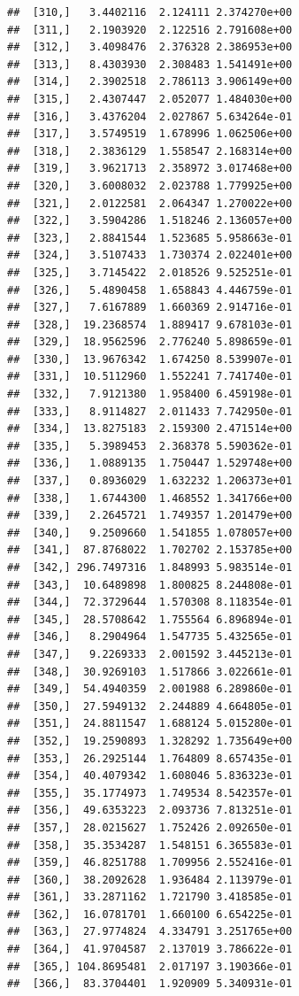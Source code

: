 \documentclass[article]{jss}\usepackage[]{graphicx}\usepackage[]{xcolor}
\makeatletter
\newenvironment{kframe}{%
 \def\at@end@of@kframe{}%
 \ifinner\ifhmode%
  \def\at@end@of@kframe{\end{minipage}}%
  \begin{minipage}{\columnwidth}%
 \fi\fi%
 \def\FrameCommand##1{\hskip\@totalleftmargin \hskip-\fboxsep
 \colorbox{shadecolor}{##1}\hskip-\fboxsep
     \hskip-\linewidth \hskip-\@totalleftmargin \hskip\columnwidth}%
 \MakeFramed {\advance\hsize-\width
   \@totalleftmargin\z@ \linewidth\hsize
   \@setminipage}}%
 {\par\unskip\endMakeFramed%
 \at@end@of@kframe}
\newenvironment{knitrout}{}{} %
\makeatother
\begin{document}
\begin{knitrout}
\begin{kframe}
\begin{verbatim}
##  [310,]   3.4402116  2.124111 2.374270e+00
##  [311,]   2.1903920  2.122516 2.791608e+00
##  [312,]   3.4098476  2.376328 2.386953e+00
##  [313,]   8.4303930  2.308483 1.541491e+00
##  [314,]   2.3902518  2.786113 3.906149e+00
##  [315,]   2.4307447  2.052077 1.484030e+00
##  [316,]   3.4376204  2.027867 5.634264e-01
##  [317,]   3.5749519  1.678996 1.062506e+00
##  [318,]   2.3836129  1.558547 2.168314e+00
##  [319,]   3.9621713  2.358972 3.017468e+00
##  [320,]   3.6008032  2.023788 1.779925e+00
##  [321,]   2.0122581  2.064347 1.270022e+00
##  [322,]   3.5904286  1.518246 2.136057e+00
##  [323,]   2.8841544  1.523685 5.958663e-01
##  [324,]   3.5107433  1.730374 2.022401e+00
##  [325,]   3.7145422  2.018526 9.525251e-01
##  [326,]   5.4890458  1.658843 4.446759e-01
##  [327,]   7.6167889  1.660369 2.914716e-01
##  [328,]  19.2368574  1.889417 9.678103e-01
##  [329,]  18.9562596  2.776240 5.898659e-01
##  [330,]  13.9676342  1.674250 8.539907e-01
##  [331,]  10.5112960  1.552241 7.741740e-01
##  [332,]   7.9121380  1.958400 6.459198e-01
##  [333,]   8.9114827  2.011433 7.742950e-01
##  [334,]  13.8275183  2.159300 2.471514e+00
##  [335,]   5.3989453  2.368378 5.590362e-01
##  [336,]   1.0889135  1.750447 1.529748e+00
##  [337,]   0.8936029  1.632232 1.206373e+01
##  [338,]   1.6744300  1.468552 1.341766e+00
##  [339,]   2.2645721  1.749357 1.201479e+00
##  [340,]   9.2509660  1.541855 1.078057e+00
##  [341,]  87.8768022  1.702702 2.153785e+00
##  [342,] 296.7497316  1.848993 5.983514e-01
##  [343,]  10.6489898  1.800825 8.244808e-01
##  [344,]  72.3729644  1.570308 8.118354e-01
##  [345,]  28.5708642  1.755564 6.896894e-01
##  [346,]   8.2904964  1.547735 5.432565e-01
##  [347,]   9.2269333  2.001592 3.445213e-01
##  [348,]  30.9269103  1.517866 3.022661e-01
##  [349,]  54.4940359  2.001988 6.289860e-01
##  [350,]  27.5949132  2.244889 4.664805e-01
##  [351,]  24.8811547  1.688124 5.015280e-01
##  [352,]  19.2590893  1.328292 1.735649e+00
##  [353,]  26.2925144  1.764809 8.657435e-01
##  [354,]  40.4079342  1.608046 5.836323e-01
##  [355,]  35.1774973  1.749534 8.542357e-01
##  [356,]  49.6353223  2.093736 7.813251e-01
##  [357,]  28.0215627  1.752426 2.092650e-01
##  [358,]  35.3534287  1.548151 6.365583e-01
##  [359,]  46.8251788  1.709956 2.552416e-01
##  [360,]  38.2092628  1.936484 2.113979e-01
##  [361,]  33.2871162  1.721790 3.418585e-01
##  [362,]  16.0781701  1.660100 6.654225e-01
##  [363,]  27.9774824  4.334791 3.251765e+00
##  [364,]  41.9704587  2.137019 3.786622e-01
##  [365,] 104.8695481  2.017197 3.190366e-01
##  [366,]  83.3704401  1.920909 5.340931e-01

\end{verbatim}
\end{kframe}
\end{knitrout}
\end{document}
